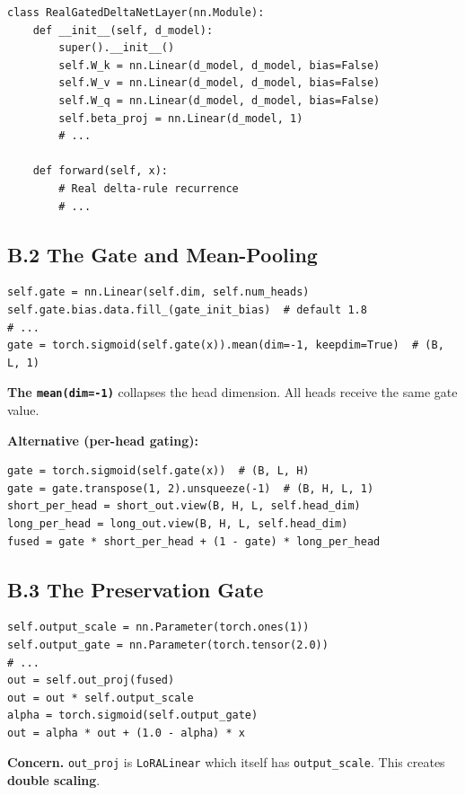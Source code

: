 \begin{lstlisting}
class RealGatedDeltaNetLayer(nn.Module):
    def __init__(self, d_model):
        super().__init__()
        self.W_k = nn.Linear(d_model, d_model, bias=False)
        self.W_v = nn.Linear(d_model, d_model, bias=False)
        self.W_q = nn.Linear(d_model, d_model, bias=False)
        self.beta_proj = nn.Linear(d_model, 1)
        # ...

    def forward(self, x):
        # Real delta-rule recurrence
        # ...
\end{lstlisting}

\subsection{B.2 The Gate and Mean-Pooling}

\begin{lstlisting}
self.gate = nn.Linear(self.dim, self.num_heads)
self.gate.bias.data.fill_(gate_init_bias)  # default 1.8
# ...
gate = torch.sigmoid(self.gate(x)).mean(dim=-1, keepdim=True)  # (B, L, 1)
\end{lstlisting}

\textbf{The \texttt{mean(dim=-1)}} collapses the head dimension. All heads receive the 
same gate value.

\textbf{Alternative (per-head gating):}

\begin{lstlisting}
gate = torch.sigmoid(self.gate(x))  # (B, L, H)
gate = gate.transpose(1, 2).unsqueeze(-1)  # (B, H, L, 1)
short_per_head = short_out.view(B, H, L, self.head_dim)
long_per_head = long_out.view(B, H, L, self.head_dim)
fused = gate * short_per_head + (1 - gate) * long_per_head
\end{lstlisting}

\subsection{B.3 The Preservation Gate}

\begin{lstlisting}
self.output_scale = nn.Parameter(torch.ones(1))
self.output_gate = nn.Parameter(torch.tensor(2.0))
# ...
out = self.out_proj(fused)
out = out * self.output_scale
alpha = torch.sigmoid(self.output_gate)
out = alpha * out + (1.0 - alpha) * x
\end{lstlisting}

\textbf{Concern.} \texttt{out\_proj} is \texttt{LoRALinear} which itself has \texttt{output\_scale}. 
This creates \textbf{double scaling}.

